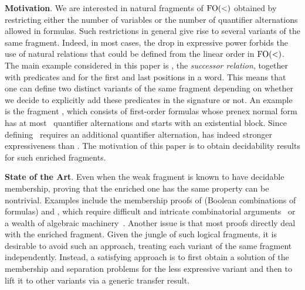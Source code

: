 \documentclass[a4paper,USenglish]{lipics}
\newcommand{\fow}{\ensuremath{\textup{FO}(<)}\xspace}
\newcommand\highlight[1]{\par\bigskip\noindent\textbf{\sffamily #1}.}
\theoremstyle{plain}
\begin{document}
\highlight{Motivation}  We are interested in natural fragments
of \fow obtained by restricting either the number of variables or the number
of quantifier alternations allowed in formulas. Such restrictions in general
give rise to several variants of the same fragment. Indeed, in most cases, the
drop in expressive power forbids the use of natural relations that could be
defined from the linear order in \fow. The main example considered in this
paper is , the \emph{successor relation}, together with predicates 
and  for the first and last positions in a word. This means that one can
define two distinct variants of the same fragment depending on whether we
decide to explicitly add these predicates in the signature or
not. An example is the fragment , which consists of first-order formulas
whose prenex normal form has at most~ quantifier alternations and starts with an
existential block. Since defining~ requires an additional
quantifier alternation,  has indeed stronger expressiveness than .
The motivation of this paper is to obtain decidability results for such
enriched fragments.

\highlight{State of the Art} Even when the weak fragment is
known to have decidable membership, proving that the enriched one has
the same property can be nontrivial. Examples include the membership
proofs of  (Boolean combinations of  formulas) and
, which require difficult and intricate combinatorial
arguments~\cite{Knast:dd1:1983a,glasser-dd3/2,DBLP:journals/ijfcs/KufleitnerL12}
or a wealth of algebraic machinery~\cite{pwdelta,pw:wreath}. Another issue is that most proofs
directly deal with the enriched fragment. Given the jungle of such logical
fragments, it is desirable to avoid such an approach, treating each variant of
the same fragment independently. Instead, a satisfying approach is to first
obtain a solution of the membership and separation problems for the less
expressive variant and then to lift it to other variants via a generic
transfer result.
\end{document}
